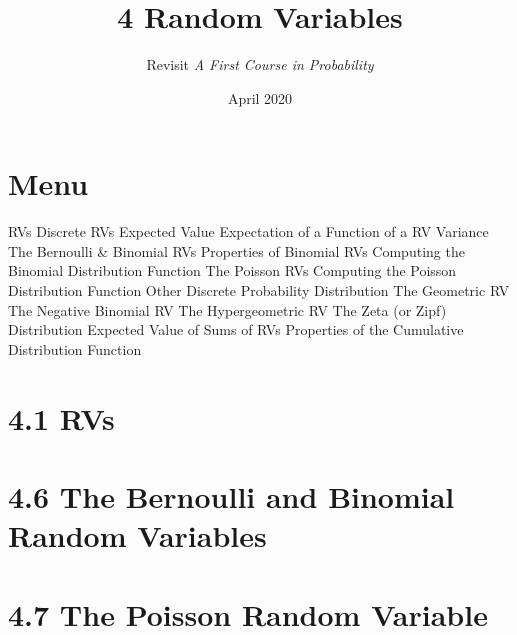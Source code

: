 \documentclass{article}
\title{4 Random Variables}
\author{Revisit \emph{A First Course in Probability}}
\date{April 2020}
\begin{document}
\maketitle

\section*{Menu}
\begin{outline}[enumerate]
    \1  RVs
    \1  Discrete RVs
    \1  Expected Value
    \1  Expectation of a Function of a RV
    \1  Variance
    \1  The Bernoulli & Binomial RVs
        \2 Properties of Binomial RVs
        \2 Computing the Binomial Distribution Function
    \1  The Poisson RVs 
        \2 Computing the Poisson Distribution Function
    \1  Other Discrete Probability Distribution
        \2 The Geometric RV
        \2 The Negative Binomial RV
        \2 The Hypergeometric RV
        \2 The Zeta (or Zipf) Distribution 
    \1  Expected Value of Sums of RVs
    \1  Properties of the Cumulative Distribution Function 
\end{outline}


\section*{4.1 RVs}
\section*{4.6 The Bernoulli and Binomial Random Variables}
\section*{4.7 The Poisson Random Variable}





\end{document}
